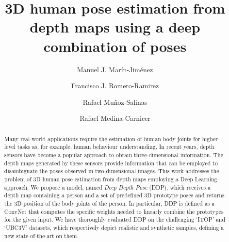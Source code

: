 \documentclass[review,12pt,3p]{elsarticle}
\begin{document}
 



\begin{frontmatter}

\title{3D human pose estimation from depth maps using a deep combination of poses}


\author[label1,label2]{Manuel J. Mar\'in-Jim\'enez}
\address[label1]{Departamento de Inform\'atica y An\'alisis Num\'erico, Campus de Rabanales, Universidad de C\'ordoba, 14071, C\'ordoba, Spain}
\address[label2]{Instituto Maim\'onides de Investigaci\'on en Biomedicina (IMIBIC). Avenida Men\'endez Pidal s/n, 14004, C\'ordoba, Spain}

\author[label1]{Francisco J. Romero-Ramirez}

\author[label1,label2]{Rafael Mu\~noz-Salinas}

\author[label1,label2]{Rafael Medina-Carnicer}




\begin{abstract}
Many real-world applications require the estimation of human body joints for higher-level tasks as, for example, human behaviour understanding. In recent years, depth sensors have become a popular approach to obtain three-dimensional information. The depth maps generated by these sensors provide information that can be employed to disambiguate the poses observed in two-dimensional images. This work addresses the problem of 3D human pose estimation from depth maps employing a Deep Learning approach. We propose a model, named \textit{Deep Depth Pose} (DDP), which receives a depth map containing a person and a set of predefined 3D prototype poses  and returns the 3D position of the body joints of the person. In particular, DDP is defined as a ConvNet that computes the specific weights needed to linearly combine the prototypes for the given input.
We have thoroughly evaluated DDP on the challenging `ITOP' and `UBC3V' datasets, which respectively depict  realistic and synthetic samples, defining a new state-of-the-art on them.
\end{abstract}


\end{frontmatter}
\end{document}
